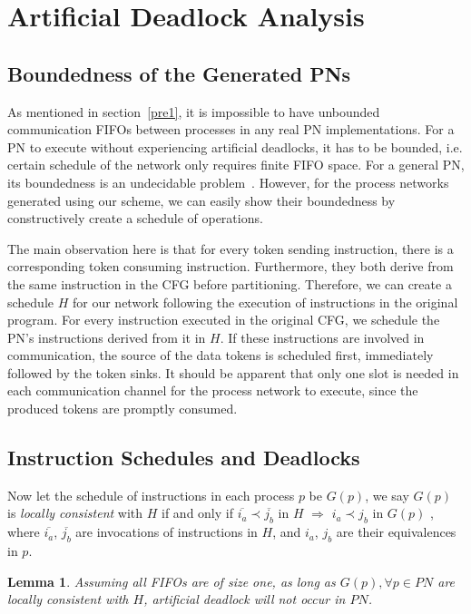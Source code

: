 \documentclass{sig-alternate}
\newtheorem{lemma}[theorem]{Lemma}
\begin{document}

\section{Artificial Deadlock Analysis}
\label{deadlock}
\subsection{Boundedness of the Generated PNs}
As mentioned in section~\ref{pre1}, it is impossible to have unbounded communication FIFOs between processes in any real PN implementations. For a PN to execute without experiencing artificial deadlocks, it has to be bounded, i.e. certain schedule of the network only requires finite FIFO space.
For a general PN, its boundedness is an undecidable problem~\cite{parks1995bounded}. However, for the process networks generated using our scheme, 
we can easily show their boundedness by constructively create a schedule of operations.

The main observation here is that for every token sending instruction, there is a corresponding token consuming instruction. Furthermore, they both derive from the same instruction in the CFG before partitioning. Therefore, we can create a schedule $H$ for our network following the execution of instructions in the original program. For every instruction executed in the original CFG, we schedule the PN's instructions derived from it in $H$. If these instructions are involved in communication, the source of the data tokens is scheduled first, immediately followed by the token sinks. It should be apparent that only one slot is needed
in each communication channel for the process network to execute, since the produced tokens are promptly consumed.

\subsection{Instruction Schedules and Deadlocks}
Now let the schedule of instructions in each process $p$ be $G(p)$, we say $G(p)$ is \textit{locally consistent} with $H$ if and only if 
$\overline{i_a} \prec \overline{j_b}$ in $H$ $\Rightarrow$ $i_a \prec j_b$ in $G(p)$
, where $\overline{i_a}$, $\overline{j_b}$ are invocations of instructions in $H$, and $i_a$, $j_b$ are their equivalences in $p$. 
\begin{lemma}
\label{nondeadlock}
Assuming 
all FIFOs are of size one,
as long as $G(p), \forall p \in PN$ are locally consistent with $H$,
artificial deadlock will not occur in $PN$. 
\end{lemma}
\end{document}
